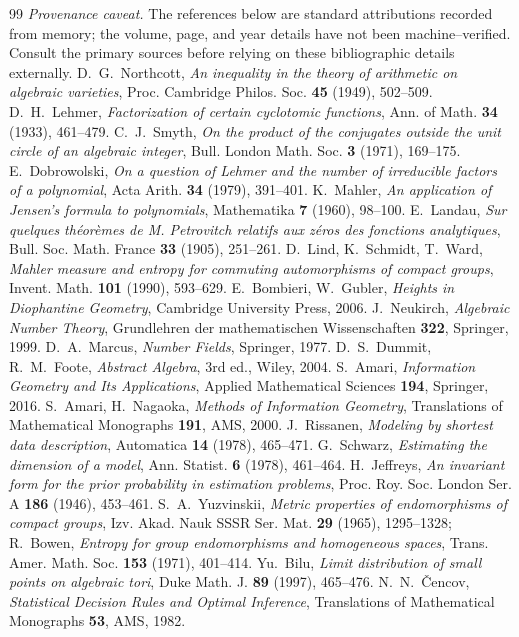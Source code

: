 \documentclass[11pt]{article}
\theoremstyle{plain}
\theoremstyle{definition}
\theoremstyle{remark}
\begin{document}
\begin{thebibliography}{99}
 \emph{Provenance caveat.} The references below are standard attributions
  recorded from memory; the volume, page, and year details have not been machine--verified. Consult the
  primary sources before relying on these bibliographic details externally.
 D.~G.~Northcott, \emph{An inequality in the theory of arithmetic on algebraic
  varieties}, Proc. Cambridge Philos. Soc. \textbf{45} (1949), 502--509.
 D.~H.~Lehmer, \emph{Factorization of certain cyclotomic functions}, Ann. of Math.
  \textbf{34} (1933), 461--479.
 C.~J.~Smyth, \emph{On the product of the conjugates outside the unit circle of an algebraic
  integer}, Bull. London Math. Soc. \textbf{3} (1971), 169--175.
 E.~Dobrowolski, \emph{On a question of Lehmer and the number of irreducible factors of
  a polynomial}, Acta Arith. \textbf{34} (1979), 391--401.
 K.~Mahler, \emph{An application of Jensen's formula to polynomials}, Mathematika
  \textbf{7} (1960), 98--100.
 E.~Landau, \emph{Sur quelques th\'eor\`emes de M. Petrovitch relatifs aux z\'eros des
  fonctions analytiques}, Bull. Soc. Math. France \textbf{33} (1905), 251--261.
 D.~Lind, K.~Schmidt, T.~Ward, \emph{Mahler measure and entropy for commuting automorphisms of
  compact groups}, Invent. Math. \textbf{101} (1990), 593--629.
 E.~Bombieri, W.~Gubler, \emph{Heights in Diophantine Geometry}, Cambridge
  University Press, 2006.
 J.~Neukirch, \emph{Algebraic Number Theory}, Grundlehren der mathematischen
  Wissenschaften \textbf{322}, Springer, 1999.
 D.~A.~Marcus, \emph{Number Fields}, Springer, 1977.
 D.~S.~Dummit, R.~M.~Foote, \emph{Abstract Algebra}, 3rd ed., Wiley, 2004.
 S.~Amari, \emph{Information Geometry and Its Applications}, Applied Mathematical Sciences
  \textbf{194}, Springer, 2016.
 S.~Amari, H.~Nagaoka, \emph{Methods of Information Geometry}, Translations of
  Mathematical Monographs \textbf{191}, AMS, 2000.
 J.~Rissanen, \emph{Modeling by shortest data description}, Automatica \textbf{14}
  (1978), 465--471.
 G.~Schwarz, \emph{Estimating the dimension of a model}, Ann. Statist. \textbf{6} (1978),
  461--464.
 H.~Jeffreys, \emph{An invariant form for the prior probability in estimation problems},
  Proc. Roy. Soc. London Ser. A \textbf{186} (1946), 453--461.
 S.~A.~Yuzvinskii, \emph{Metric properties of endomorphisms of compact groups}, Izv.
  Akad. Nauk SSSR Ser. Mat. \textbf{29} (1965), 1295--1328; R.~Bowen, \emph{Entropy for group endomorphisms
  and homogeneous spaces}, Trans. Amer. Math. Soc. \textbf{153} (1971), 401--414.
 Yu.~Bilu, \emph{Limit distribution of small points on algebraic tori}, Duke Math. J.
  \textbf{89} (1997), 465--476.
 N.~N.~\v{C}encov, \emph{Statistical Decision Rules and Optimal Inference}, Translations of
  Mathematical Monographs \textbf{53}, AMS, 1982.
\end{thebibliography}
\end{document}
